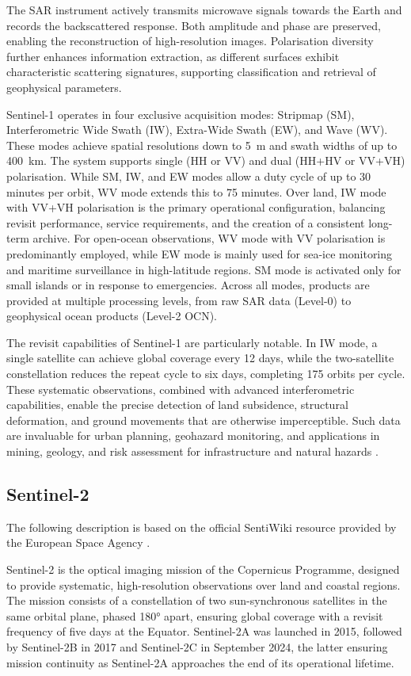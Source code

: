 The SAR instrument actively transmits microwave signals towards the Earth and records the backscattered response. Both amplitude and phase are preserved, enabling the reconstruction of high-resolution images. Polarisation diversity further enhances information extraction, as different surfaces exhibit characteristic scattering signatures, supporting classification and retrieval of geophysical parameters.  

Sentinel-1 operates in four exclusive acquisition modes: Stripmap (SM), Interferometric Wide Swath (IW), Extra-Wide Swath (EW), and Wave (WV). These modes achieve spatial resolutions down to 5~m and swath widths of up to 400~km. The system supports single (HH or VV) and dual (HH+HV or VV+VH) polarisation. While SM, IW, and EW modes allow a duty cycle of up to 30 minutes per orbit, WV mode extends this to 75 minutes. Over land, IW mode with VV+VH polarisation is the primary operational configuration, balancing revisit performance, service requirements, and the creation of a consistent long-term archive. For open-ocean observations, WV mode with VV polarisation is predominantly employed, while EW mode is mainly used for sea-ice monitoring and maritime surveillance in high-latitude regions. SM mode is activated only for small islands or in response to emergencies. Across all modes, products are provided at multiple processing levels, from raw SAR data (Level-0) to geophysical ocean products (Level-2 OCN).  

The revisit capabilities of Sentinel-1 are particularly notable. In IW mode, a single satellite can achieve global coverage every 12 days, while the two-satellite constellation reduces the repeat cycle to six days, completing 175 orbits per cycle. These systematic observations, combined with advanced interferometric capabilities, enable the precise detection of land subsidence, structural deformation, and ground movements that are otherwise imperceptible. Such data are invaluable for urban planning, geohazard monitoring, and applications in mining, geology, and risk assessment for infrastructure and natural hazards \cite{sentiwiki}.  

\subsection{Sentinel-2}
The following description is based on the official SentiWiki resource provided by the European Space Agency \cite{sentiwiki}. 

Sentinel-2 is the optical imaging mission of the Copernicus Programme, designed to provide systematic, high-resolution observations over land and coastal regions. The mission consists of a constellation of two sun-synchronous satellites in the same orbital plane, phased 180° apart, ensuring global coverage with a revisit frequency of five days at the Equator. Sentinel-2A was launched in 2015, followed by Sentinel-2B in 2017 and Sentinel-2C in September 2024, the latter ensuring mission continuity as Sentinel-2A approaches the end of its operational lifetime.  

